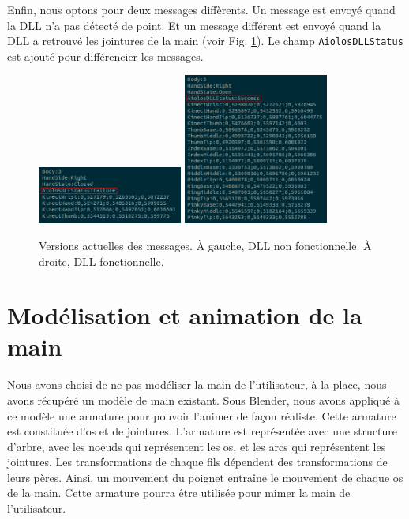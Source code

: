Enfin, nous optons pour deux messages diffèrents. Un message 
est envoyé quand la DLL n'a pas détecté de point. Et un message 
différent est envoyé quand la DLL a retrouvé les jointures de la main (voir Fig. \ref{fig:socketv3}).
Le champ \texttt{AiolosDLLStatus} est ajouté pour différencier les 
messages.

\begin{figure}[H]
  \label{fig:socketv3}
  \begin{center}
    \includegraphics[width=180px]{images/socket_v3-2.png}
    \includegraphics[width=180px]{images/socket_v3-1.png}
    \caption{Versions actuelles des messages. À gauche, DLL non fonctionnelle. À droite, DLL fonctionnelle.}
  \end{center}
\end{figure}


\section{Modélisation et animation de la main}
\label{Real_Animation}
\paragraph{}
Nous avons choisi de ne pas modéliser la main de l'utilisateur, à la place, nous avons récupéré un modèle de main existant.
Sous Blender, nous avons appliqué à ce modèle une armature pour pouvoir l'animer de façon réaliste. Cette armature est constituée d'os et de jointures. L'armature est représentée avec une structure 
d'arbre, avec les noeuds qui représentent les os, et les arcs qui représentent les jointures. Les transformations de chaque fils dépendent des transformations de leurs pères. Ainsi, un mouvement du poignet 
entraîne le mouvement de chaque os de la main. Cette armature pourra être utilisée pour mimer la main de l'utilisateur. 

